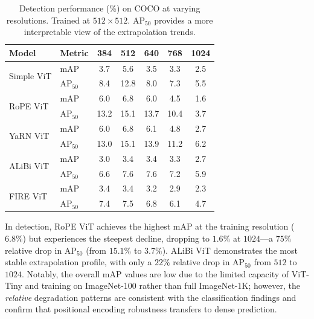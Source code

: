 \begin{table}[t]
\centering
\caption{Detection performance (\%) on COCO at varying resolutions. Trained at $512 \times 512$. AP$_{50}$ provides a more interpretable view of the extrapolation trends.}
\label{tab:detection_map}
\small
\begin{tabular}{ll|ccccc}
\toprule
\textbf{Model} & \textbf{Metric} & \textbf{384} & \textbf{512} & \textbf{640} & \textbf{768} & \textbf{1024} \\
\midrule
\multirow{2}{*}{Simple ViT} & mAP & 3.7 & 5.6 & 3.5 & 3.3 & 2.5 \\
                            & AP$_{50}$ & 8.4 & 12.8 & 8.0 & 7.3 & 5.5 \\
\midrule
\multirow{2}{*}{RoPE ViT}   & mAP & 6.0 & 6.8 & 6.0 & 4.5 & 1.6 \\
                            & AP$_{50}$ & 13.2 & 15.1 & 13.7 & 10.4 & 3.7 \\
\midrule
\multirow{2}{*}{YaRN ViT}   & mAP & 6.0 & 6.8 & 6.1 & 4.8 & 2.7 \\
                            & AP$_{50}$ & 13.0 & 15.1 & 13.9 & 11.2 & 6.2 \\
\midrule
\multirow{2}{*}{ALiBi ViT}  & mAP & 3.0 & 3.4 & 3.4 & 3.3 & 2.7 \\
                            & AP$_{50}$ & 6.6 & 7.6 & 7.6 & 7.2 & 5.9 \\
\midrule
\multirow{2}{*}{FIRE ViT}   & mAP & 3.4 & 3.4 & 3.2 & 2.9 & 2.3 \\
                            & AP$_{50}$ & 7.4 & 7.5 & 6.8 & 6.1 & 4.7 \\
\bottomrule
\end{tabular}
\end{table}

In detection, RoPE ViT achieves the highest mAP at the training resolution ($6.8\%$) but
experiences the steepest decline, dropping to $1.6\%$ at $1024$---a $75\%$ relative drop in AP$_{50}$ (from $15.1\%$ to $3.7\%$). ALiBi ViT demonstrates the
most stable extrapolation profile, with only a $22\%$ relative drop in AP$_{50}$ from $512$ to $1024$. Notably, the
overall mAP values are low due to the limited capacity of ViT-Tiny and training on ImageNet-100
rather than full ImageNet-1K; however, the \emph{relative} degradation patterns are consistent with
the classification findings and confirm that positional encoding robustness transfers to dense
prediction.

